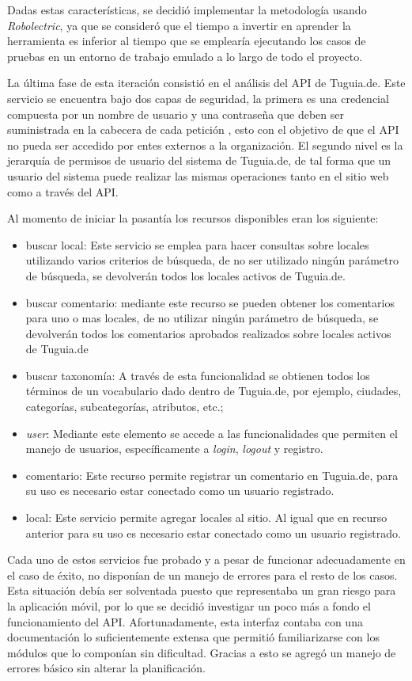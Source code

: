 Dadas estas características, se decidió implementar la metodología usando \textit{Robolectric}, ya que se consideró que el tiempo a invertir en aprender la herramienta es inferior al tiempo que se emplearía ejecutando los casos de pruebas en un entorno de trabajo emulado a lo largo de todo el proyecto.

La última fase de esta iteración consistió en el análisis del API de Tuguia.de. Este servicio se encuentra bajo dos capas de seguridad, la primera es una credencial compuesta por un nombre de usuario y una contraseña que deben ser suministrada en la cabecera de cada petición , esto con el objetivo de que el API no pueda ser accedido  por entes externos a la organización. El segundo nivel es la jerarquía de permisos de usuario del sistema de Tuguia.de, de tal forma que un usuario del sistema puede realizar las mismas operaciones tanto en el sitio web como a través del API. 

Al momento de iniciar la pasantía los recursos disponibles eran los siguiente:
\begin{itemize}
\item buscar local: Este servicio se emplea para hacer consultas sobre locales utilizando varios criterios de búsqueda, de no ser utilizado ningún parámetro de búsqueda, se devolverán todos los locales activos de Tuguia.de.
\item buscar comentario: mediante este recurso se pueden obtener los comentarios para uno o mas locales, de no utilizar ningún parámetro de búsqueda, se devolverán todos los comentarios aprobados realizados sobre locales activos de Tuguia.de
\item buscar taxonomía: A través de esta funcionalidad se obtienen todos los términos de un vocabulario dado dentro de Tuguia.de, por ejemplo, ciudades, categorías, subcategorías, atributos, etc.;
\item \textit{user}: Mediante este elemento se accede a las funcionalidades que permiten el manejo de usuarios, específicamente a \textit{login}, \textit{logout} y registro.
\item comentario: Este recurso permite registrar un comentario en Tuguia.de, para su uso es necesario estar conectado como un usuario registrado.
\item local: Este servicio permite agregar locales al sitio. Al igual que en recurso anterior para su uso es necesario estar conectado como un usuario registrado.
\end{itemize}

Cada uno de estos servicios fue probado y a pesar de funcionar adecuadamente en el caso de éxito, no disponían de un manejo de errores para el resto de los casos. Esta situación debía ser solventada puesto que representaba un gran riesgo para la aplicación móvil, por lo que se decidió investigar un poco más a fondo el funcionamiento del API. Afortunadamente, esta interfaz contaba con una documentación lo suficientemente extensa que permitió familiarizarse con los módulos que lo componían sin dificultad. Gracias a esto se agregó un manejo de errores básico sin alterar la planificación.

